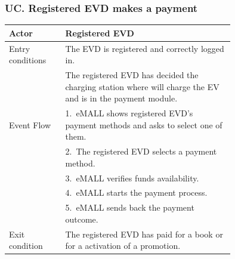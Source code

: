 \begin{center}
\end{center}

\subsubsection*{UC\cuc . Registered EVD makes a payment}
\begin{center}
    \begin{longtable}{lp{0.75\linewidth}}
        \hline
        Actor            & Registered EVD                                                                                                        \\
        \hline
        Entry conditions & The EVD is registered and correctly logged in.                                                                        \\
        & The registered EVD has decided the charging station where will charge the EV and is in the payment module.            \\
        \hline
        Event Flow       & 1.\ eMALL shows registered EVD's payment methods and asks to select one of them.                                      \\
        & 2.\ The registered EVD selects a payment method.                                                                      \\
        & 3.\ eMALL verifies funds availability.                                                                                \\
        & 4.\ eMALL starts the payment process.                                                                                 \\
        & 5.\ eMALL sends back the payment outcome.                                                                             \\
        \hline
        Exit condition   & The registered EVD has paid for a book or for a activation of a promotion.                                            \\

\end{longtable}
\end{center}
